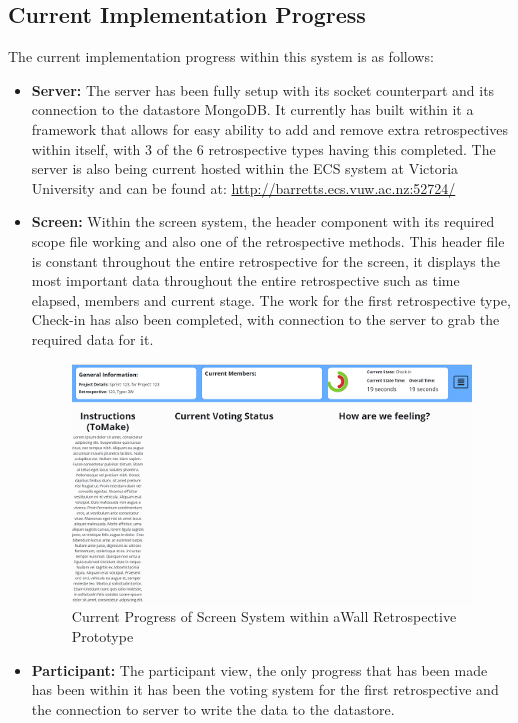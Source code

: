 \subsection{Current Implementation Progress}
The current implementation progress within this system is as follows:
\begin{itemize}
\item \textbf{Server:} The server has been fully setup with its socket counterpart and its connection to the datastore MongoDB. It currently has built within it a framework that allows for easy ability to add and remove extra retrospectives within itself, with 3 of the 6 retrospective types having this completed. The server is also being current hosted within the ECS system at Victoria University and can be found at: \url{http://barretts.ecs.vuw.ac.nz:52724/}
\item \textbf{Screen:} Within the screen system, the header component with its required scope file working and also one of the retrospective methods. This header file is constant throughout the entire retrospective for the screen, it displays the most important data throughout the entire retrospective such as time elapsed, members and current stage. The work for the first retrospective type, Check-in has also been completed, with connection to the server to grab the required data for it. 
\begin{figure}[ht]
\centering
\includegraphics{moderator_progress}
\caption{Current Progress of Screen System within aWall Retrospective Prototype} \label{fig:modProgress}
\end{figure}
\item \textbf{Participant:} The participant view, the only progress that has been made has been within it has been the voting system for the first retrospective and the connection to server to write the data to the datastore.

\end{itemize}
